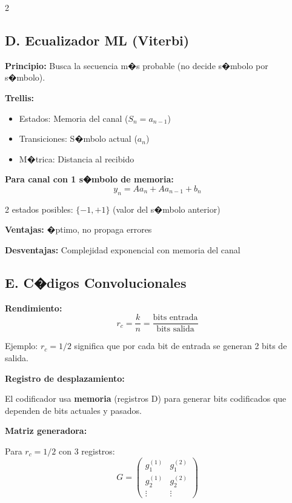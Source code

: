 ﻿\documentclass[8pt,a4paper]{article}
\begin{document}
\begin{multicols}{2}
\vspace{-2mm}
\subsection*{\small D. Ecualizador ML (Viterbi)}
\vspace{-2mm}

\textbf{Principio:} Busca la secuencia m�s probable (no decide s�mbolo por s�mbolo).

\textbf{Trellis:}
\begin{itemize}[leftmargin=*,itemsep=2pt]
    \item Estados: Memoria del canal ($S_n = a_{n-1}$)
    \item Transiciones: S�mbolo actual ($a_n$)
    \item M�trica: Distancia al recibido
\end{itemize}

\textbf{Para canal con 1 s�mbolo de memoria:}
\[
y_n = A a_n + A a_{n-1} + b_n
\]

2 estados posibles: $\{-1, +1\}$ (valor del s�mbolo anterior)

\textbf{Ventajas:} �ptimo, no propaga errores

\textbf{Desventajas:} Complejidad exponencial con memoria del canal

\vspace{-2mm}
\subsection*{\small E. C�digos Convolucionales}
\vspace{-2mm}

\textbf{Rendimiento:}
\[
r_c = \frac{k}{n} = \frac{\text{bits entrada}}{\text{bits salida}}
\]

Ejemplo: $r_c = 1/2$ significa que por cada bit de entrada se generan 2 bits de salida.

\textbf{Registro de desplazamiento:}

El codificador usa \textbf{memoria} (registros D) para generar bits codificados que dependen de bits actuales y pasados.

\textbf{Matriz generadora:}

Para $r_c = 1/2$ con 3 registros:
\[
G = \begin{pmatrix}
g_1^{(1)} & g_1^{(2)} \\
g_2^{(1)} & g_2^{(2)} \\
\vdots & \vdots
\end{pmatrix}
\]


\end{multicols}
\end{document}
